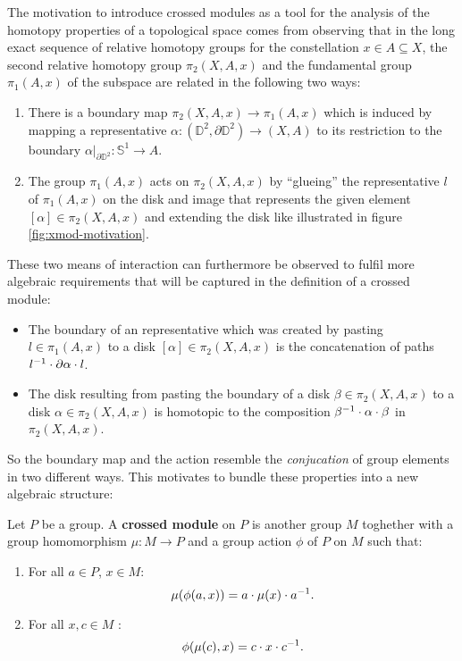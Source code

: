 The motivation to introduce crossed modules as a tool for the analysis of the
homotopy properties of a topological space comes from observing that in the
long exact sequence of relative homotopy groups for the constellation 
$x \in A \subseteq X$,
the second relative homotopy group $\pi_2(X, A, x)$ and the fundamental group
$\pi_1(A, x)$ of the subspace are related in the following two ways:
\begin{enumerate}
\item There is a boundary map $\pi_2(X, A, x) \to \pi_1(A, x)$ which is induced
by mapping a representative $\alpha : (\mathbb{D}^2, \partial \mathbb{D}^2) \to 
(X, A)$ to its restriction to the boundary $\left.\alpha\right|_{\partial \mathbb{D}^2}
: \mathbb{S}^1 \to A$.
\item The group $\pi_1(A, x)$ acts on $\pi_2(X, A, x)$ by ``glueing'' the
representative $l$ of $\pi_1(A, x)$ on the disk and image that represents the given
element $[\alpha] \in \pi_2(X, A, x)$ and 
extending the disk like illustrated in figure \ref{fig:xmod-motivation}.
\end{enumerate}
These two means of interaction can furthermore be observed to fulfil more algebraic
requirements that will be captured in the definition of a crossed module:
\begin{itemize}
\item The boundary of an representative which was created by pasting $l \in \pi_1(A, x)$
to a disk $[\alpha] \in \pi_2(X, A, x)$ is the
concatenation of paths $l^{-1} \cdot \partial \alpha \cdot l$.
\item The disk resulting from pasting the boundary of a disk $\beta \in \pi_2(X, A, x)$
to a disk $\alpha \in \pi_2(X, A, x)$ is homotopic to the composition
$\beta^{-1} \cdot \alpha \cdot \beta$ in $\pi_2(X, A, x)$.
\end{itemize}
So the boundary map and the action resemble the \emph{conjucation} of group elements
in two different ways. This motivates to bundle these properties into a new algebraic
structure:

\begin{defn}
Let $P$ be a group. A \textbf{crossed module} on $P$ is another group $M$ toghether
with a group homomorphism $\mu : M \to P$ and a group action $\phi$ of $P$ on
$M$ such that:
\begin{enumerate}
\item For all $a \in P$, $x \in M$:
\begin{equation} \label{eq:gp-CM1}
\mu(\phi(a,x)) = a \cdot \mu(x) \cdot a\inv \text{.} %
\end{equation}
\item For all $x, c \in M$ :
\begin{equation} \label{eq:gp-CM2}
\phi(\mu(c),x) = c \cdot x \cdot c^{-1} \text{.}
\end{equation}
\end{enumerate}
\end{defn}

